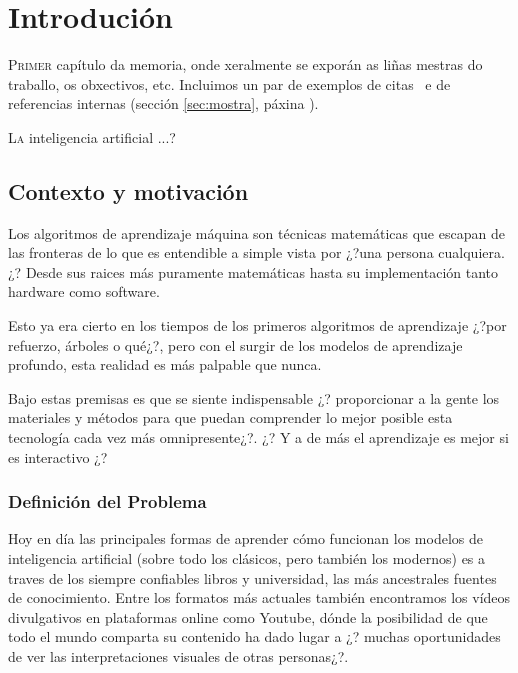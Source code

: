 \chapter{Introdución}
\label{chap:introducion}

\lettrine{P}{rimer} capítulo da memoria, onde xeralmente se exporán as
liñas mestras do traballo, os obxectivos, etc. Incluimos un par de
exemplos de citas~\cite{ErlangBook,ErlangWebBook} e de referencias
internas (sección \ref{sec:mostra}, páxina \pageref{sec:mostra}).

\lettrine{L}a inteligencia artificial ...?


\section{Contexto y motivación}
\label{sec:contexto_y_motivacion}

Los algoritmos de aprendizaje máquina son técnicas matemáticas que escapan de las fronteras de lo que es entendible a simple vista por ¿?una persona cualquiera.¿?
Desde sus raices más puramente matemáticas hasta su implementación tanto hardware como software. 

Esto ya era cierto en los tiempos de los primeros algoritmos de aprendizaje ¿?por refuerzo, árboles o qué¿?,
pero con el surgir de los modelos de aprendizaje profundo, esta realidad es más palpable que nunca.

Bajo estas premisas es que se siente indispensable ¿? proporcionar a la gente los materiales y métodos para que puedan comprender lo mejor posible esta tecnología cada vez más omnipresente¿?.
¿? Y a de más el aprendizaje es mejor si es interactivo ¿?



\subsection{Definición del Problema}

Hoy en día las principales formas de aprender cómo funcionan los modelos de inteligencia artificial (sobre todo los clásicos, pero también los modernos) es a traves de los siempre confiables libros y universidad, las más ancestrales fuentes de conocimiento.
Entre los formatos más actuales también encontramos los vídeos divulgativos en plataformas online como Youtube,
dónde la posibilidad de que todo el mundo comparta su contenido ha dado lugar a ¿? muchas oportunidades de ver las interpretaciones visuales de otras personas¿?.

